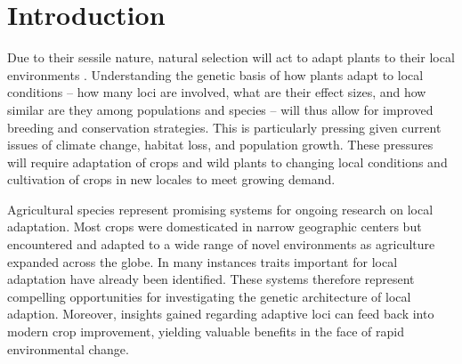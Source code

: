 
\begin{center}
\end{center}
%
%

\section*{Introduction}

Due to their sessile nature, natural selection will act to adapt plants to their local environments \citep{stebbins1950variation}. Understanding the genetic basis of how plants adapt to local conditions -- how many loci are involved, what are their effect sizes, and how similar are they among populations and species -- will thus allow for improved breeding and conservation strategies.  This is particularly pressing given current issues of climate change, habitat loss, and population growth.  These pressures will require adaptation of crops and wild plants to changing local conditions and cultivation of crops in new locales to meet growing demand.   

Agricultural species represent  promising systems for ongoing research on local adaptation.  Most crops were domesticated in narrow geographic centers but encountered and adapted to a wide range of novel environments as agriculture expanded across the globe.  In many instances  traits important for  local adaptation have already been identified.  These systems therefore represent compelling opportunities for investigating the genetic architecture of local adaption.  Moreover, insights gained regarding adaptive loci can feed back into modern crop improvement, yielding valuable benefits in the face of  rapid environmental change.

